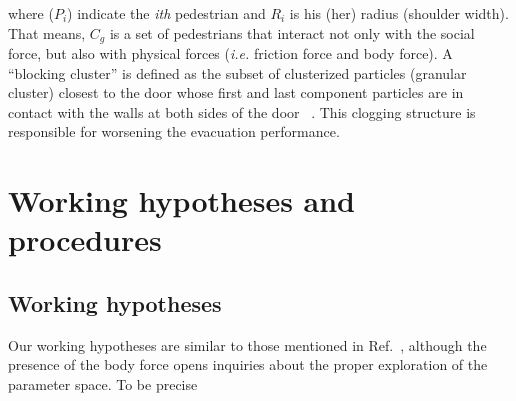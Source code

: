 \documentclass[preprint,12pt]{elsarticle}
\begin{document}
where ($P_i$) indicate the \textit{ith} pedestrian and $R_i$ is his (her) radius (shoulder width). That means, $C_g$ is a
set of pedestrians that interact not only with the social force, but also with physical forces (\textit{i.e.} friction force and body force).
A ``blocking cluster'' is defined as the subset of clusterized particles (granular cluster) closest to the door whose first 
and last component particles are in contact with the walls at both sides of the door ~\cite{dorso_2005}.
This clogging structure is responsible for worsening the evacuation performance. 


\section{\label{hypotheses}Working hypotheses and procedures}


\subsection{Working hypotheses}

Our working hypotheses are similar to those mentioned in 
Ref.~\cite{dorso_2019}, 
although the presence of the body force opens inquiries about the proper 
exploration of the parameter space. To be precise
\end{document}
